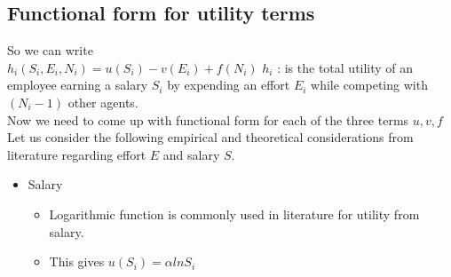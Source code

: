 \documentclass[letterpaper,english,10pt]{article}
\begin{document}
\subsection{Functional form for utility terms}
So we can write \\
$h_i(S_i,E_i,N_i) = u(S_i) - v(E_i) + f(N_i)$
$h_i$ : is the total utility of an employee earning a salary $S_i$ by expending an effort $E_i$ while competing with $(N_i -1) $ other agents. \\

Now we need to come up with functional form for each of the three terms $u,v,f$ \\
Let us consider the following empirical and theoretical considerations from literature regarding effort $E$ and salary $S$.
\begin{itemize}
\item Salary
 \begin{itemize}
    \item Logarithmic function is commonly used in literature for utility from salary. 
       
    \item This gives $u(S_i) = \alpha ln S_i$
       

\end{itemize}
\end{itemize}
\end{document}
